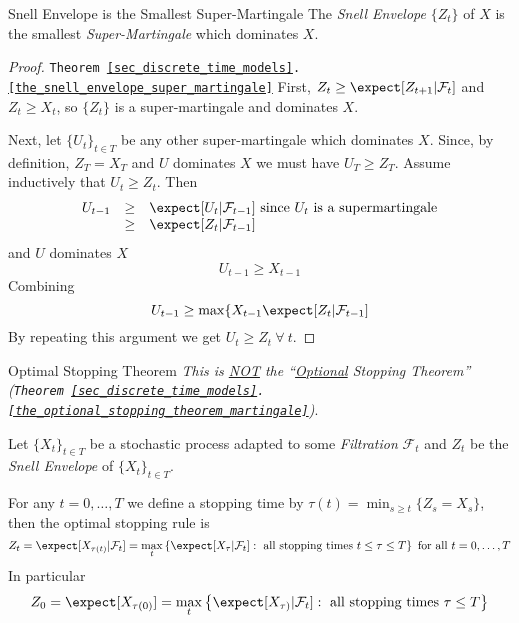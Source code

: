 \documentclass[11pt,a4paper]{article}
\begin{document}
  \begin{theorem}{Snell Envelope is the Smallest Super-Martingale}\label{the_snell_envelope_super_martingale}
    The \textit{Snell Envelope} $\{Z_t\}$ of $X$ is the smallest \textit{Super-Martingale} which dominates $X$.
  \end{theorem}

  \begin{proof}{\texttt{Theorem \ref{sec_discrete_time_models}.\ref{the_snell_envelope_super_martingale}}}
    First, $Z_t\geq\expect[Z_{t+1}|\mathcal{F}_t]$ and $Z_t\geq X_t$, so $\{Z_t\}$ is a super-martingale and dominates $X$.
    \par Next, let $\{U_t\}_{t\in T}$ be any other super-martingale which dominates $X$. Since, by definition, $Z_T=X_T$ and $U$ dominates $X$ we must have $U_T\geq Z_T$. Assume inductively that $U_t\geq Z_t$. Then
    \[\begin{array}{rcl}
      U_{t-1}&\geq&\expect[U_t|\mathcal{F}_{t-1}]\text{ since }U_t\text{ is a supermartingale}\\
      &\geq&\expect[Z_t|\mathcal{F}_{t-1}]
    \end{array}\]
    and $U$ dominates $X$
    \[ U_{t-1}\geq X_{t-1} \]
    Combining
    \[ U_{t-1}\geq\max\{X_{t-1}\expect[Z_t|\mathcal{F}_{t-1}] \]
    By repeating this argument we get $U_t\geq Z_t\ \forall\ t$.\proved
  \end{proof}

  \begin{theorem}{Optimal Stopping Theorem}\label{the_optimal_stopping_theorem}
    \textit{This is \underline{NOT} the ``\underline{Optional} Stopping Theorem'' (\texttt{Theorem \ref{sec_discrete_time_models}.\ref{the_optional_stopping_theorem_martingale}})}.
    \par Let $\{X_t\}_{t\in T}$ be a stochastic process adapted to some \textit{Filtration} $\mathcal{F}_t$ and $Z_t$ be the \textit{Snell Envelope} of $\{X_t\}_{t\in T}$.
    \par For any $t=0,\dots,T$ we define a stopping time by $\tau(t)=\min_{s\geq t}\{Z_s=X_s\}$, then the optimal stopping rule is
    \begin{equation}\label{eq_optimal_stopping_rule}
      Z_t=\expect[X_{\tau(t)}|\mathcal{F}_t]=\max_t\left\{\expect[X_{\tau}|\mathcal{F}_t]:\text{ all stopping times }t\leq\tau\leq T\right\}\text{ for all }t=0,\dots,T
    \end{equation}
    In particular
    \[ Z_0=\expect[X_{\tau(0)}]=\max_t\left\{\expect[X_{\tau)}|\mathcal{F}_t]:\text{ all stopping times }\tau\leq T\right\} \]
  \end{theorem}
\end{document}
